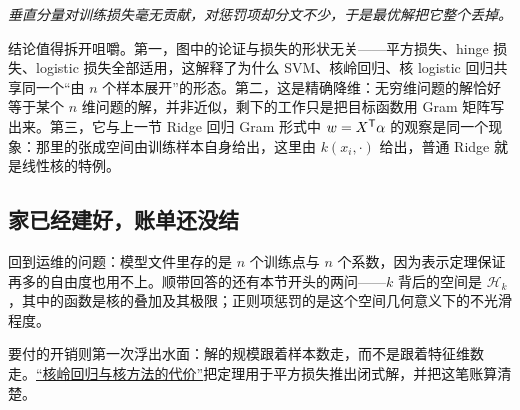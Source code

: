 \emph{垂直分量对训练损失毫无贡献，对惩罚项却分文不少，于是最优解把它整个丢掉。}

结论值得拆开咀嚼。第一，图中的论证与损失的形状无关——平方损失、hinge 损失、logistic 损失全部适用，这解释了为什么 SVM、核岭回归、核 logistic 回归共享同一个``由 \(n\) 个样本展开''的形态。第二，这是精确降维：无穷维问题的解恰好等于某个 \(n\) 维问题的解，并非近似，剩下的工作只是把目标函数用 Gram 矩阵写出来。第三，它与上一节 Ridge 回归 Gram 形式中 \(w=X^{\mathsf{T}}\alpha\) 的观察是同一个现象：那里的张成空间由训练样本自身给出，这里由 \(k(x_i,\cdot)\) 给出，普通 Ridge 就是线性核的特例。

\subsection{家已经建好，账单还没结}

回到运维的问题：模型文件里存的是 \(n\) 个训练点与 \(n\) 个系数，因为表示定理保证再多的自由度也用不上。顺带回答的还有本节开头的两问——\(k\) 背后的空间是 \(\mathcal{H}_k\)，其中的函数是核的叠加及其极限；正则项惩罚的是这个空间几何意义下的不光滑程度。

要付的开销则第一次浮出水面：解的规模跟着样本数走，而不是跟着特征维数走。\hyperref[sec:13-Machine-Learning/09-Kernel-Methods-and-Gaussian-Processes/04]{``核岭回归与核方法的代价''}把定理用于平方损失推出闭式解，并把这笔账算清楚。
